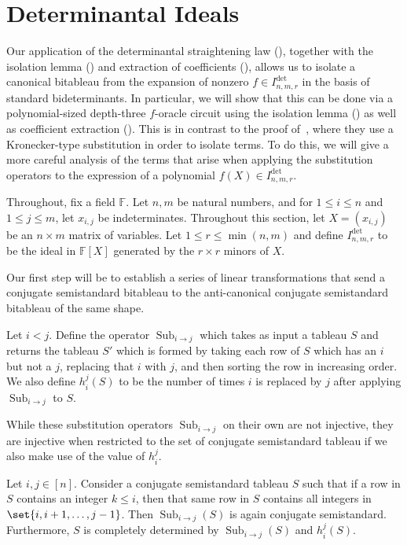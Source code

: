 \documentclass[10pt,a4paper]{amsart}
\DeclareMathOperator{\Sub}{Sub}
\newcommand*\F{\mathbb{F}}
\begin{document}
\section{Determinantal Ideals}\label{sec:det}

Our application of the determinantal straightening law  (), together with the isolation lemma () and extraction of coefficients (), allows us to isolate a canonical bitableau from the expansion of nonzero $f \in I^{\det}_{n, m, r}$ in the basis of standard bideterminants.
In particular, we will show that this can be done via a polynomial-sized depth-three $f$-oracle circuit using the isolation lemma () as well as coefficient extraction ().
This is in contrast to the proof of~\cite{AF21}, where they use a Kronecker-type substitution in order to isolate terms.
To do this, we will give a more careful analysis of the terms that arise when applying the substitution operators to the expression of a polynomial $f(X) \in I^{\det}_{n, m, r}$.

Throughout, fix a field $\F$.
Let $n, m$ be natural numbers, and for $1 \leq i \leq n$ and $1 \leq j \leq m$, let $x_{i, j}$ be indeterminates.
Throughout this section, let $X = (x_{i, j})$ be an $n \times m$ matrix of variables.
Let $1 \leq r \leq \min(n, m)$ and define $I^{\det}_{n, m, r}$ to be the ideal in $\F[X]$ generated by the $r \times r$ minors of $X$.

Our first step will be to establish a series of linear transformations that send a conjugate semistandard bitableau to the anti-canonical conjugate semistandard bitableau of the same shape.
\begin{defn}\label{defn:sub}
    Let $i < j$.
    Define the operator $\Sub_{i \to j}$ which takes as input a tableau $S$ and returns the tableau $S'$ which is formed by taking each row of $S$ which has an $i$ but not a $j$, replacing that $i$ with $j$, and then sorting the row in increasing order.
    We also define $h_{i}^{j}(S)$ to be the number of times $i$ is replaced by $j$ after applying $\Sub_{i \to j}$ to $S$.
\end{defn}

While these substitution operators $\Sub_{i \to j}$ on their own are not injective, they are injective when restricted to the set of conjugate semistandard tableau if we also make use of the value of $h_{i}^{j}$.
\begin{lem}\label{lem:sub_injective}
    Let $i, j \in [n]$.
    Consider a conjugate semistandard tableau $S$ such that if a row in $S$ contains an integer $k \leq i$, then that same row in $S$ contains all integers in $\set{i, i + 1, \ldots, j - 1}$.
    Then $\Sub_{i \to j}(S)$ is again conjugate semistandard. 
    Furthermore, $S$ is completely determined by $\Sub_{i \to j}(S)$ and $h_{i}^{j}(S)$.
\end{lem}
\end{document}
